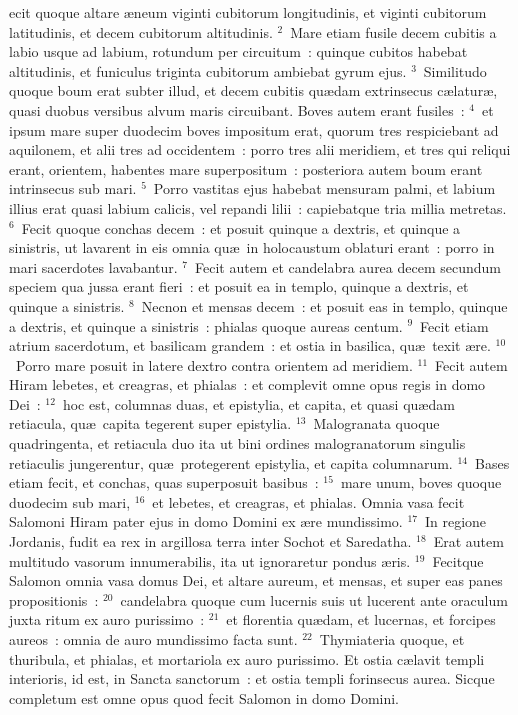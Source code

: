 \bchapter
{}ecit quoque altare \ae neum viginti cubitorum longitudinis, et viginti cubitorum latitudinis, et decem cubitorum altitudinis.
${}^{2}$~Mare etiam fusile decem cubitis a labio usque ad labium, rotundum per circuitum~: quinque cubitos habebat altitudinis, et funiculus triginta cubitorum ambiebat gyrum ejus.
${}^{3}$~Similitudo quoque boum erat subter illud, et decem cubitis qu\ae dam extrinsecus c\ae latur\ae , quasi duobus versibus alvum maris circuibant. Boves autem erant fusiles~:
${}^{4}$~et ipsum mare super duodecim boves impositum erat, quorum tres respiciebant ad aquilonem, et alii tres ad occidentem~: porro tres alii meridiem, et tres qui reliqui erant, orientem, habentes mare superpositum~: posteriora autem boum erant intrinsecus sub mari.
${}^{5}$~Porro vastitas ejus habebat mensuram palmi, et labium illius erat quasi labium calicis, vel repandi lilii~: capiebatque tria millia metretas.
${}^{6}$~Fecit quoque conchas decem~: et posuit quinque a dextris, et quinque a sinistris, ut lavarent in eis omnia qu\ae\ in holocaustum oblaturi erant~: porro in mari sacerdotes lavabantur.
${}^{7}$~Fecit autem et candelabra aurea decem secundum speciem qua jussa erant fieri~: et posuit ea in templo, quinque a dextris, et quinque a sinistris.
${}^{8}$~Necnon et mensas decem~: et posuit eas in templo, quinque a dextris, et quinque a sinistris~: phialas quoque aureas centum.
${}^{9}$~Fecit etiam atrium sacerdotum, et basilicam grandem~: et ostia in basilica, qu\ae\ texit \ae re.
${}^{10}$~Porro mare posuit in latere dextro contra orientem ad meridiem.
${}^{11}$~Fecit autem Hiram lebetes, et creagras, et phialas~: et complevit omne opus regis in domo Dei~:
${}^{12}$~hoc est, columnas duas, et epistylia, et capita, et quasi qu\ae dam retiacula, qu\ae\ capita tegerent super epistylia.
${}^{13}$~Malogranata quoque quadringenta, et retiacula duo ita ut bini ordines malogranatorum singulis retiaculis jungerentur, qu\ae\ protegerent epistylia, et capita columnarum.
${}^{14}$~Bases etiam fecit, et conchas, quas superposuit basibus~:
${}^{15}$~mare unum, boves quoque duodecim sub mari,
${}^{16}$~et lebetes, et creagras, et phialas. Omnia vasa fecit Salomoni Hiram pater ejus in domo Domini ex \ae re mundissimo.
${}^{17}$~In regione Jordanis, fudit ea rex in argillosa terra inter Sochot et Saredatha.
${}^{18}$~Erat autem multitudo vasorum innumerabilis, ita ut ignoraretur pondus \ae ris.
${}^{19}$~Fecitque Salomon omnia vasa domus Dei, et altare aureum, et mensas, et super eas panes propositionis~:
${}^{20}$~candelabra quoque cum lucernis suis ut lucerent ante oraculum juxta ritum ex auro purissimo~:
${}^{21}$~et florentia qu\ae dam, et lucernas, et forcipes aureos~: omnia de auro mundissimo facta sunt.
${}^{22}$~Thymiateria quoque, et thuribula, et phialas, et mortariola ex auro purissimo. Et ostia c\ae lavit templi interioris, id est, in Sancta sanctorum~: et ostia templi forinsecus aurea. Sicque completum est omne opus quod fecit Salomon in domo Domini.

